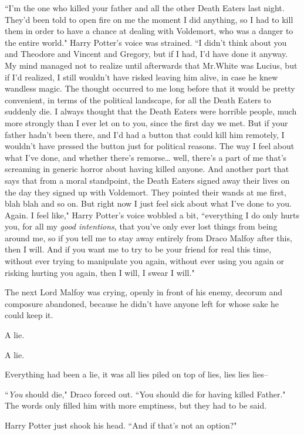 ``I'm the one who killed your father and all the other Death Eaters last night. They'd been told to open fire on me the moment I did anything, so I had to kill them in order to have a chance at dealing with Voldemort, who was a danger to the entire world." Harry Potter's voice was strained. ``I didn't think about you and Theodore and Vincent and Gregory, but if I had, I'd have done it anyway. My mind managed not to realize until afterwards that Mr.\?White was Lucius, but if I'd realized, I still wouldn't have risked leaving him alive, in case he knew wandless magic. The thought occurred to me long before that it would be pretty convenient, in terms of the political landscape, for all the Death Eaters to suddenly die. I always thought that the Death Eaters were horrible people, much more strongly than I ever let on to you, since the first day we met. But if your father hadn't been there, and I'd had a button that could kill him remotely, I wouldn't have pressed the button just for political reasons. The way I feel about what I've done, and whether there's remorse{\ldots} well, there's a part of me that's screaming in generic horror about having killed anyone. And another part that says that from a moral standpoint, the Death Eaters signed away their lives on the day they signed up with Voldemort. They pointed their wands at me first, blah blah and so on. But right now I just feel sick about what I've done to you. Again. I feel like," Harry Potter's voice wobbled a bit, ``everything I do only hurts you, for all my \emph{good intentions}, that you've only ever lost things from being around me, so if you tell me to stay away entirely from Draco Malfoy after this, then I will. And if you want me to try to be your friend for real this time, without ever trying to manipulate you again, without ever using you again or risking hurting you again, then I will, I swear I will."

The next Lord Malfoy was crying, openly in front of his enemy, decorum and composure abandoned, because he didn't have anyone left for whose sake he could keep it.

A lie.

A lie.

Everything had been a lie, it was all lies piled on top of lies, lies lies lies\---

``\emph{You} should die," Draco forced out. ``You should die for having killed Father." The words only filled him with more emptiness, but they had to be said.

Harry Potter just shook his head. ``And if that's not an option?"

